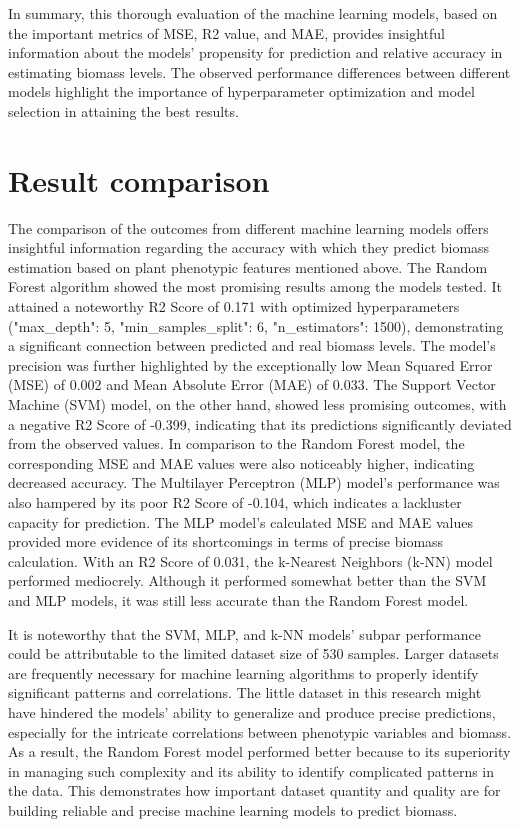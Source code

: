 \documentclass[a4paper,12pt]{report}%
\renewcommand{\\}{\vspace*{0.5\baselineskip} \newline}
\begin{document}
\noindent In summary, this thorough evaluation of the machine learning models, based on the important metrics of MSE, R2 value, and MAE, provides insightful information about the models' propensity for prediction and relative accuracy in estimating biomass levels. The observed performance differences between different models highlight the importance of hyperparameter optimization and model selection in attaining the best results.


\section{Result comparison}
The comparison of the outcomes from different machine learning models offers insightful information regarding the accuracy with which they predict biomass estimation based on plant phenotypic features mentioned above. The Random Forest algorithm showed the most promising results among the models tested. It attained a noteworthy R2 Score of 0.171 with optimized hyperparameters ("max\_depth": 5, "min\_samples\_split": 6, "n\_estimators": 1500), demonstrating a significant connection between predicted and real biomass levels. The model's precision was further highlighted by the exceptionally low Mean Squared Error (MSE) of 0.002 and Mean Absolute Error (MAE) of 0.033.
The Support Vector Machine (SVM) model, on the other hand, showed less promising outcomes, with a negative R2 Score of -0.399, indicating that its predictions significantly deviated from the observed values. In comparison to the Random Forest model, the corresponding MSE and MAE values were also noticeably higher, indicating decreased accuracy. The Multilayer Perceptron (MLP) model's performance was also hampered by its poor R2 Score of -0.104, which indicates a lackluster capacity for prediction. The MLP model's calculated MSE and MAE values provided more evidence of its shortcomings in terms of precise biomass calculation.
With an R2 Score of 0.031, the k-Nearest Neighbors (k-NN) model performed mediocrely. Although it performed somewhat better than the SVM and MLP models, it was still less accurate than the Random Forest model.

\noindent It is noteworthy that the SVM, MLP, and k-NN models' subpar performance could be attributable to the limited dataset size of 530 samples. Larger datasets are frequently necessary for machine learning algorithms to properly identify significant patterns and correlations. The little dataset in this research might have hindered the models' ability to generalize and produce precise predictions, especially for the intricate correlations between phenotypic variables and biomass. As a result, the Random Forest model performed better because to its superiority in managing such complexity and its ability to identify complicated patterns in the data. This demonstrates how important dataset quantity and quality are for building reliable and precise machine learning models to predict biomass.
\end{document}
